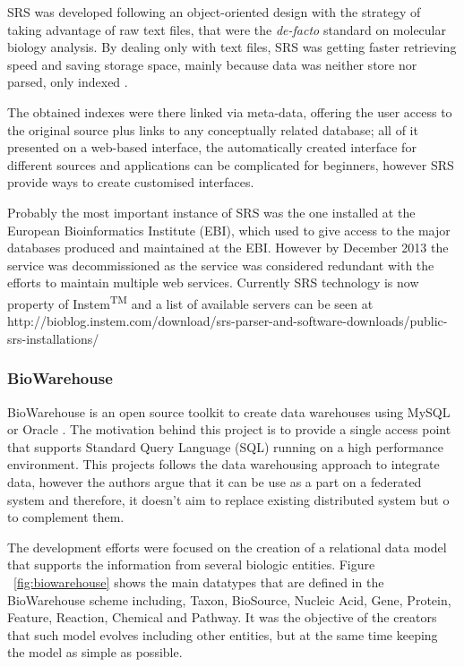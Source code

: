 SRS was developed following an object-oriented design with the strategy of taking advantage of raw text files, that were the \emph{de-facto} standard on molecular biology analysis. By dealing only with text files, SRS was getting faster retrieving speed and saving storage space, mainly because data was neither store nor parsed, only indexed \cite{ZDO2002}.

The obtained indexes were there linked via meta-data, offering the user access to the original source plus links to any conceptually related database; all of it presented on a web-based interface, the automatically created interface for different sources and applications can be complicated for beginners, however SRS provide ways to create customised interfaces.

Probably the most important instance of SRS was the one installed at the European Bioinformatics Institute (EBI), which used to give access to the major databases produced and maintained at the EBI. However by December 2013 the service was decommissioned as the service was considered redundant with the efforts to maintain multiple web services. Currently SRS technology is now property of Instem\textsuperscript{TM} and a list of available servers can be seen at http://bioblog.instem.com/download/srs-parser-and-software-downloads/public-srs-installations/


\subsubsection{BioWarehouse}
BioWarehouse is an open source toolkit to create data warehouses using MySQL or Oracle \cite{LEE2006}. The motivation behind this project is to provide  a single access point that supports Standard Query Language (SQL) running on a high performance environment.
This projects follows the data warehousing approach to integrate data, however the authors argue that it can be use as a part on a federated system and therefore, it doesn't aim to replace existing distributed system but o to complement them.

The development efforts were focused on the creation of a relational data model that supports the information from several biologic entities. Figure ~\ref{fig:biowarehouse} shows the main datatypes that are defined in the BioWarehouse scheme including, Taxon, BioSource, Nucleic Acid, Gene, Protein, Feature, Reaction, Chemical and Pathway. It was the objective of the creators that such model evolves including other entities, but at the same time keeping the model as simple as possible.

